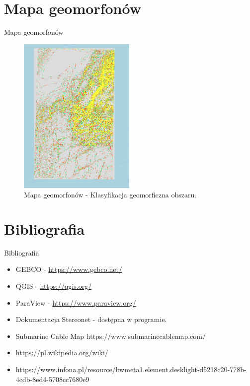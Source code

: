 \documentclass{beamer}
\begin{document}
\section{Mapa geomorfonów}
\begin{frame}{Mapa geomorfonów }
	\begin{figure}
		\centering
		\includegraphics[width=0.5\textwidth]{geomorfy.png} %
		\caption{Mapa geomorfonów - Klasyfikacja geomorficzna obszaru.}
	\end{figure}
\end{frame}

\section{Bibliografia}
\begin{frame}{Bibliografia}
    \begin{itemize}
        \item GEBCO - \url{https://www.gebco.net/}
        \item QGIS - \url{https://qgis.org/}
        \item ParaView - \url{https://www.paraview.org/}
        \item Dokumentacja Stereonet - dostępna w programie.
        \item Submarine Cable Map https://www.submarinecablemap.com/
        \item https://pl.wikipedia.org/wiki/
        \item https://www.infona.pl/resource/bwmeta1.element.desklight-d5218c20-778b-4cdb-8ed4-5708cc7680e9
    \end{itemize}
\end{frame}
\end{document}
